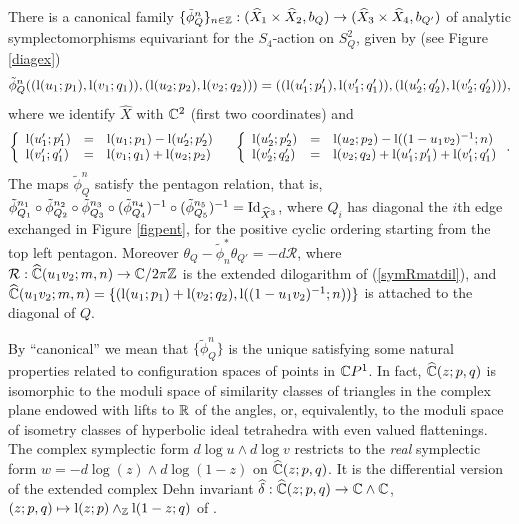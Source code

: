 \begin{prop}\label{flipform} 
There is a canonical family $\{\tilde{\phi}_Q^n\}_{n\in \mathbb{Z}}:
(\widehat{X}_1 \times \widehat{X}_2,b_Q)\rightarrow (\widehat{X}_3
\times \widehat{X}_4,b_{Q'})$ of analytic symplectomorphisms
equivariant for the $S_4$-action on $S_Q^2$, given by (see
Figure \ref{diagex})
$$ \tilde{\phi}_Q^n(({\rm l}(u_1;p_1),{\rm l}(v_1;q_1)),({\rm
    l}(u_2;p_2),{\rm l}(v_2;q_2))) = (({\rm l}(u_1';p_1'),{\rm
    l}(v_1';q_1')),({\rm l}(u_2';q_2'),{\rm l}(v_2';q_2'))),$$ where we
    identify $\widehat{X}$ with $\mathbb{C}^2$ (first two coordinates) and
$$\left\lbrace\begin{array}{lll}{\rm l}(u_1';p_1') & = & {\rm
l}(u_1;p_1) -{\rm l}(u_2';p_2') \\{\rm l}(v_1';q_1')& = & {\rm
l}(v_1;q_1) + {\rm l}(u_2;p_2)\end{array}\right.\quad
\left\lbrace\begin{array}{lll} {\rm l}(u_2';p_2') & = & {\rm
l}(u_2;p_2)-{\rm l}((1-u_1v_2)^{-1};n)\\{\rm l}(v_2';q_2')& = & {\rm
l}(v_2;q_2) +{\rm l}(u_1';p_1')+{\rm l}(v_1';q_1')
\end{array}\right. .$$
The maps $\tilde{\phi}_Q^n$ satisfy the pentagon relation, that is,
$\tilde{\phi}_{Q_1}^{n_1}\circ\tilde{\phi}_{Q_2}^{n_2}
\circ\tilde{\phi}_{Q_3}^{n_3}\circ(\tilde{\phi}_{Q_4}^{n_4})^{-1}\circ
(\tilde{\phi}_{Q_5}^{n_5})^{-1}={\rm Id}_{\widehat{X}^3}$, where $Q_i$
has diagonal the $i$th edge exchanged in Figure \ref{figpent}, for the
positive cyclic ordering starting from the top left pentagon. Moreover
$\theta_Q -\tilde{\phi}_n^*\theta_{Q'}= -d\mathcal{R}$, where
$\mathcal{R}:\widehat{\mathbb{C}}(u_1v_2;m,n)\rightarrow \mathbb{C}/2\pi\mathbb{Z}$ is the
extended dilogarithm of (\ref{symRmatdil}), and
$\widehat{\mathbb{C}}(u_1v_2;m,n)=\{({\rm l}(u_1;p_1)+{\rm l}(v_2;q_2),{\rm
l}((1-u_1v_2)^{-1};n))\}$ is attached to the diagonal of $Q$.
\end{prop}
By ``canonical'' we mean that $\{\tilde{\phi}_Q^n\}$ is the unique
satisfying some natural properties related to configuration spaces of
points in $\mathbb{C} P^1$. In fact, $\widehat{\mathbb{C}}(z;p,q)$ is isomorphic to
the moduli space of similarity classes of triangles in the complex
plane endowed with lifts to $\mathbb{R}$ of the angles, or, equivalently, to
the moduli space of isometry classes of hyperbolic ideal tetrahedra
with even valued flattenings. The complex symplectic form $d\log u
\wedge d\log v$ restricts to the {\it real} symplectic form
$w=-d\log(z) \wedge d\log(1-z)$ on $\widehat{\mathbb{C}}(z;p,q)$. It is the
differential version of the extended complex Dehn invariant
$\widehat{\delta}:\widehat{\mathbb{C}}(z;p,q) \rightarrow \mathbb{C} \wedge \mathbb{C}$,
$(z;p,q)\mapsto {\rm l}(z;p)\wedge_{\mathbb{Z}} {\rm l}(1-z;q)$ of \cite{N}.

